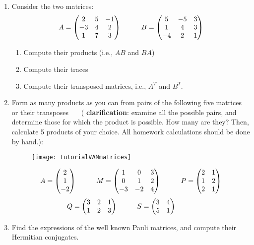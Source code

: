 \documentclass{article}
\begin{document}
\begin{enumerate}

\item  Consider the two matrices:
$$A=\begin{pmatrix}
2 & 5 & -1 \\
-3 & 4 & 2 \\
1 & 7 & 3
\end{pmatrix} \hskip 1truecm B=\begin{pmatrix}
5 & -5 & 3 \\
1 & 4 & 3 \\
-4 & 2 & 1
\end{pmatrix}$$ 
\begin{enumerate}
\item Compute their products  (i.e., $AB$ and $BA$)

\item  Compute their traces

\item  Compute their transposed matrices, i.e., $A^T$ and $B^T$. 
\end{enumerate}


\item Form as many products as you can from pairs of the following five matrices or their transposes ~~~( {\bf clarification}: examine all the possible pairs, and determine those for which the product is possible. How many are they?  Then, calculate 5 products of your choice. All homework calculations should be done by hand.): 
\begin{figure}[htbp]
\begin{center}
\texttt{[image: tutorialVAMmatrices]}
\end{center}
\end{figure}

$$A=\begin{pmatrix}
  2  \\
  1  \\
  -2 
  \end{pmatrix} \hskip 1truecm M=\begin{pmatrix}
  1 & 0 & 3 \\
  0 & 1 & 2 \\
  -3 & -2 & 4
  \end{pmatrix}\hskip 1truecm P=\begin{pmatrix}
    2 & 1  \\
    1 & 2  \\
    2 & 1 
    \end{pmatrix}
  $$ 
  $$Q=\begin{pmatrix}
    3 & 2 & 1 \\
    1 & 2 & 3 \\
    \end{pmatrix} \hskip 1truecm S=\begin{pmatrix}
    3 & 4 \\
    5 & 1 \\
    \end{pmatrix}\hskip 1truecm
  $$ 

\item Find the expressions of the well known Pauli matrices, and compute their Hermitian conjugates. 


\end{enumerate}
\end{document}
